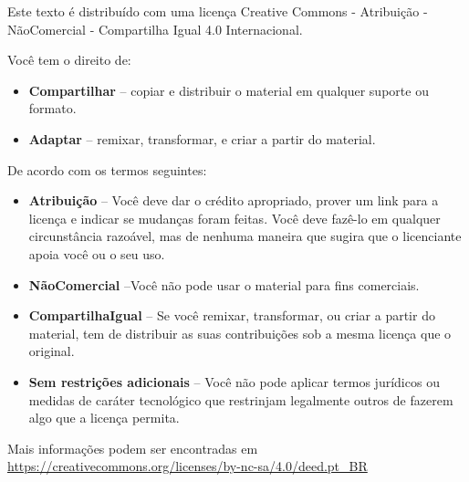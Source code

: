 Este texto é distribuído com uma licença Creative Commons - Atribuição - NãoComercial - Compartilha Igual 4.0 Internacional.


\begin{center}
    \ccbyncsa
\end{center}

Você tem o direito de:
\begin{itemize}
    \item \textbf{Compartilhar} -- copiar e distribuir o material em qualquer suporte ou formato.
    \item \textbf{Adaptar} -- remixar, transformar, e criar a partir do material.
\end{itemize}

De acordo com os termos seguintes:
\begin{itemize}
    \item \textbf{Atribuição} -- Você deve dar o crédito apropriado, prover um link para a licença e indicar se mudanças foram feitas. Você deve fazê-lo em qualquer circunstância razoável, mas de nenhuma maneira que sugira que o licenciante apoia você ou o seu uso.
    \item \textbf{NãoComercial} --Você não pode usar o material para fins comerciais.
    \item \textbf{CompartilhaIgual} -- Se você remixar, transformar, ou criar a partir do material, tem de distribuir as suas contribuições sob a mesma licença que o original.
    \item \textbf{Sem restrições adicionais} -- Você não pode aplicar termos jurídicos ou medidas de caráter tecnológico que restrinjam legalmente outros de fazerem algo que a licença permita.
\end{itemize}

Mais informações podem ser encontradas em \url{https://creativecommons.org/licenses/by-nc-sa/4.0/deed.pt_BR}